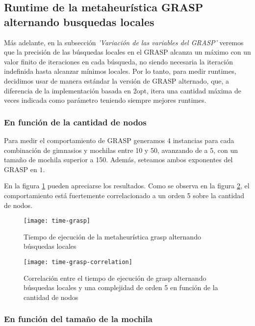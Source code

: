 \subsection{Runtime de la metaheurística GRASP alternando busquedas locales}
Más adelante, en la subsección \emph{'Variación de las variables del GRASP'} veremos que la precisión de las búsquedas locales en el GRASP alcanza un máximo con un valor finito de iteraciones en cada búsqueda, no siendo necesaria la iteración indefinida hasta alcanzar mínimos locales. Por lo tanto, para medir runtimes, decidimos usar de manera estándar la versión de GRASP alternado, que, a diferencia de la implementación basada en 2opt, itera una cantidad máxima de veces indicada como parámetro teniendo siempre mejores runtimes.

\label{sec:time-grasp}

\subsubsection{En función de la cantidad de nodos}

Para medir el comportamiento de GRASP generamos 4 instancias para cada combinación de gimnasios y mochilas entre 10 y 50, avanzando de a 5, con un tamaño de mochila superior a 150. Además, seteamos ambos exponentes del GRASP en $1$.

En la figura \ref{fig:time-grasp} pueden apreciarse los resultados. Como se observa en la figura \ref{fig:time-grasp-correlation}, el comportamiento está fuertemente correlacionado a un orden 5 sobre la cantidad de nodos.

\begin{figure}[H]
    \centering
    \texttt{[image: time-grasp]}
    \caption{Tiempo de ejecución de la metaheurística grasp alternando búsquedas locales}
    \label{fig:time-grasp}
\end{figure}

\begin{figure}[H]
    \centering
    \texttt{[image: time-grasp-correlation]}
    \caption{Correlación entre el tiempo de ejecución de grasp alternando búsquedas locales y una complejidad de orden 5 en función de la cantidad de nodos}
    \label{fig:time-grasp-correlation}
\end{figure}

\subsubsection{En función del tamaño de la mochila}

